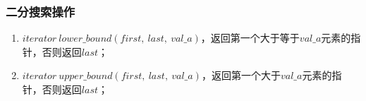 \subsubsection{二分搜索操作}
\begin{enumerate}
    \item $iterator\ lower\_bound(first,\ last,\ val\_a)$，返回第一个大于等于$val\_a$元素的指针，否则返回$last$；
    \item $iterator\ upper\_bound(first,\ last,\ val\_a)$，返回第一个大于$val\_a$元素的指针，否则返回$last$；
\end{enumerate}
